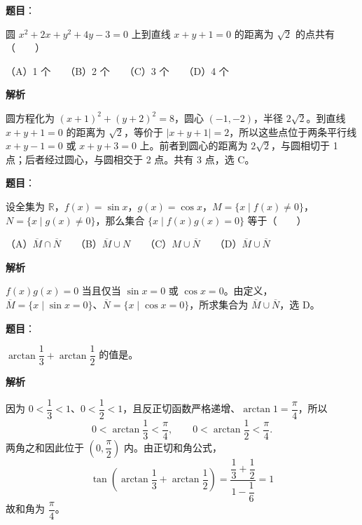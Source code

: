 \begin{answer}

\textbf{题目}：

圆 $x^2+2x+y^2+4y-3=0$ 上到直线 $x+y+1=0$ 的距离为 $\sqrt2$ 的点共有\mbox{（　　）}

（A）1 个　　（B）2 个　　（C）3 个　　（D）4 个

\textbf{解析}

圆方程化为 $(x+1)^2+(y+2)^2=8$，圆心 $(-1,-2)$，半径 $2\sqrt2$。到直线 $x+y+1=0$ 的距离为 $\sqrt2$，等价于 $|x+y+1|=2$，所以这些点位于两条平行线 $x+y-1=0$ 或 $x+y+3=0$ 上。前者到圆心的距离为 $2\sqrt2$，与圆相切于 1 点；后者经过圆心，与圆相交于 2 点。共有 3 点，选 C。


\end{answer}
\begin{answer}

\textbf{题目}：

设全集为 $\mathbb R$，$f(x)=\sin x$，$g(x)=\cos x$，$M=\{x\mid f(x)\ne0\}$，$N=\{x\mid g(x)\ne0\}$，那么集合 $\{x\mid f(x)g(x)=0\}$ 等于\mbox{（　　）}

（A）$\overline M\cap\overline N$　　（B）$\overline M\cup N$　　（C）$M\cup\overline N$　　（D）$\overline M\cup\overline N$

\textbf{解析}

$f(x)g(x)=0$ 当且仅当 $\sin x=0$ 或 $\cos x=0$。由定义，$\overline M=\{x\mid\sin x=0\}$、$\overline N=\{x\mid\cos x=0\}$，所求集合为 $\overline M\cup\overline N$，选 D。


\end{answer}
\begin{answer}

\textbf{题目}：

$\arctan\dfrac13+\arctan\dfrac12$ 的值是\underline{\hspace{6em}}。

\textbf{解析}

因为 $0<\dfrac13<1$、$0<\dfrac12<1$，且反正切函数严格递增、$\arctan1=\dfrac\pi4$，所以
\nopagebreak[4]
\[
0<\arctan\dfrac13<\dfrac\pi4,\qquad
0<\arctan\dfrac12<\dfrac\pi4.
\]
两角之和因此位于 $(0,\dfrac\pi2)$ 内。由正切和角公式，
\nopagebreak[4]
\[
\tan\left(\arctan\dfrac13+\arctan\dfrac12\right)
=\dfrac{\dfrac13+\dfrac12}{1-\dfrac16}=1
\]
故和角为 $\dfrac\pi4$。


\end{answer}
